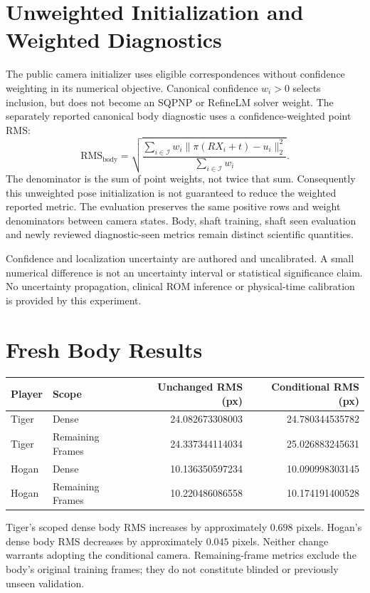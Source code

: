 \documentclass[11pt]{article}
\begin{document}
\section*{Unweighted Initialization and Weighted Diagnostics}
The public camera initializer uses eligible correspondences without confidence weighting in its numerical objective. Canonical confidence $w_i>0$ selects inclusion, but does not become an SQPNP or RefineLM solver weight. The separately reported canonical body diagnostic uses a confidence-weighted point RMS:
\[
 \mathrm{RMS}_{\mathrm{body}}=
 \sqrt{\frac{\sum_{i\in\mathcal I}w_i
 \lVert\pi(RX_i+t)-u_i\rVert_2^2}{\sum_{i\in\mathcal I}w_i}}.
\]
The denominator is the sum of point weights, not twice that sum. Consequently this unweighted pose initialization is not guaranteed to reduce the weighted reported metric. The evaluation preserves the same positive rows and weight denominators between camera states. Body, shaft training, shaft seen evaluation and newly reviewed diagnostic-seen metrics remain distinct scientific quantities.

Confidence and localization uncertainty are authored and uncalibrated. A small numerical difference is not an uncertainty interval or statistical significance claim. No uncertainty propagation, clinical ROM inference or physical-time calibration is provided by this experiment.
\newpage
\section*{Fresh Body Results}
\begin{center}\small\begin{tabular}{llrr}\toprule
Player & Scope & Unchanged RMS (px) & Conditional RMS (px)\\\midrule
Tiger & Dense & 24.082673308003 & 24.780344535782 \\
Tiger & Remaining Frames & 24.337344114034 & 25.026883245631 \\
Hogan & Dense & 10.136350597234 & 10.090998303145 \\
Hogan & Remaining Frames & 10.220486086558 & 10.174191400528 \\
\bottomrule\end{tabular}\end{center}
Tiger's scoped dense body RMS increases by approximately $0.698$ pixels. Hogan's dense body RMS decreases by approximately $0.045$ pixels. Neither change warrants adopting the conditional camera. Remaining-frame metrics exclude the body's original training frames; they do not constitute blinded or previously unseen validation.
\end{document}
